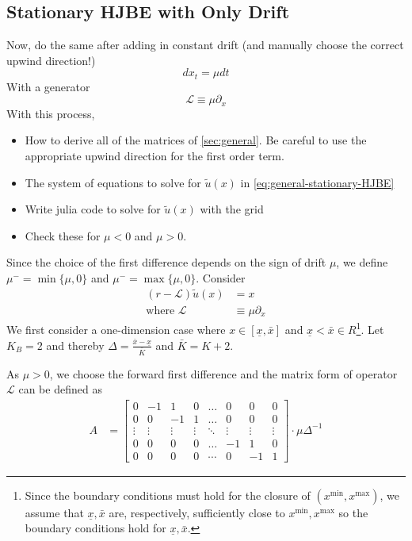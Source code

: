 \documentclass[11pt]{article}
\newcommand{\D}[1][]{\ensuremath{\partial_{#1}}}
\begin{document}
\subsection{Stationary HJBE with Only Drift}
Now, do the same after adding in constant drift (and manually choose the correct upwind direction!)
$$
d x_t = \mu dt
$$
With a generator
$$
	\mathcal{L} \equiv \mu \D[x]
$$
With this process,
\begin{itemize}
	\item How to derive all of the matrices of \cref{sec:general}.  Be careful to use the appropriate upwind direction for the first order term.
	\item The system of equations to solve for $\tilde{u}(x)$ in \cref{eq:general-stationary-HJBE}
	\item Write julia code to solve for $\tilde{u}(x)$ with the grid
	\item Check these for $\mu < 0$ and $\mu > 0$.
\end{itemize}
Since the choice of the first difference depends on the sign of drift $\mu$, we define $\mu^- =\min\{\mu, 0\}$ and $\mu^- =\max\{\mu, 0\}$.
Consider
\begin{align}
(r - \mathcal{L} )\tilde{u}(x) &= x\label{HJBE_PDE_with_drifts}\\
\text{where }\mathcal{L}&\equiv \mu\partial_{x}
\end{align}
We first consider a one-dimension case where $x\in [\underline{\textit{\~{x}}}, \bar{\textit{\~{x}}}]$ and $\underline{\textit{\~{x}}} < \bar{\textit{\~{x}}} \in R$\footnote{Since the boundary conditions must hold for the closure of $(x^{\min},x^{\max})$, we assume that $\underline{\textit{\~{x}}}, \bar{\textit{\~{x}}}$ are, respectively, sufficiently close to $x^{\min}, x^{\max}$ so the boundary conditions hold for $\underline{\textit{\~{x}}}, \bar{\textit{\~{x}}}$.}. Let $K_B = 2$ and thereby $\Delta  = \frac{\bar{\textit{\~{x}}} - \underline{\textit{\~{x}}}}{\bar{K}}$ and $\bar{K} = K+2$.

As $\mu>0$, we choose the forward first difference and the matrix form of operator $\mathcal{L}$ can be defined as
\begin{align}
A &= \begin{bmatrix}
0&-1&1&0&\dots&0&0&0\\
0&0&-1&1&\dots&0&0&0\\
\vdots&\vdots&\vdots&\vdots&\ddots&\vdots&\vdots&\vdots\\
0&0&0&0&\dots&-1&1&0\\
0&0&0&0&\cdots&0&-1&1
\end{bmatrix}\cdot\mu\Delta^{-1}
\end{align}
\end{document}
